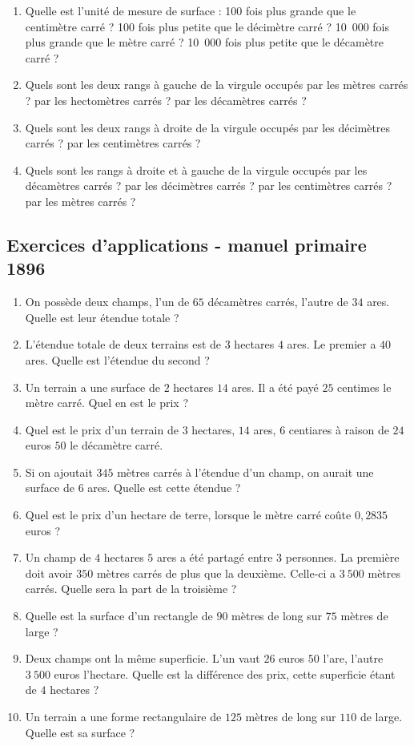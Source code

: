 \documentclass[12 pt]{extarticle}
\theoremstyle{plain}
\begin{document}
\begin{enumerate}
\item Quelle est l'unité de mesure de surface : 100 fois plus grande que le centimètre carré ? 100 fois plus petite que le décimètre carré ? 10~000 fois plus grande que le mètre carré ? 10~000 fois plus petite que le décamètre carré ? 
\item Quels sont les deux rangs à gauche de la virgule occupés par les mètres carrés ? par les hectomètres carrés ? par les décamètres carrés ? 
\item Quels sont les deux rangs à droite de la virgule
occupés par les décimètres carrés ? par les centimètres carrés ? 
\item Quels sont les rangs à droite et à gauche de la virgule occupés par les décamètres carrés ? par les décimètres carrés ? par les centimètres carrés ? par les mètres carrés ? 
\end{enumerate}  
  
  
  \subsection*{Exercices d'applications - manuel primaire 1896}
  
  \begin{enumerate}
  \item On possède deux champs, l'un de $65$ décamètres carrés, l'autre de $34$ ares. 
  Quelle est leur étendue totale ? 
  \item L'étendue totale de deux terrains est de $3$ hectares $4$ ares. Le premier a $40$ ares. Quelle est l'étendue du second ? 
  \item Un terrain a une surface de $2$ hectares $14$ ares. Il a été payé $25$ centimes le mètre carré. Quel en est le prix ? 
  \item Quel est le prix d'un terrain de $3$ hectares, $14$ ares, $6$ centiares à raison de $24$ euros $50$ le décamètre carré. 
  \item Si on ajoutait $345$ mètres carrés à l'étendue d'un champ, on aurait une surface de $6$ ares. Quelle est cette étendue ? 
  \item Quel est le prix d'un hectare de terre, lorsque le mètre carré coûte $0,2835$ euros ? 
  \item Un champ de $4$ hectares $5$ ares a été partagé entre $3$ personnes. La première doit avoir $350$ mètres carrés de plus que la deuxième. Celle-ci a $3~500$ mètres carrés. Quelle sera la part de la troisième ? 
  \item Quelle est la surface d'un rectangle de $90$ mètres de long sur $75$ mètres de large ? 
  \item Deux champs ont la même superficie. L'un vaut $26$ euros $50$ l'are, l'autre $3~500$ euros l'hectare. Quelle est la différence des prix, cette superficie étant de $4$ hectares ? 
  \item Un terrain a une forme rectangulaire de $125$ mètres de long sur $110$ de large. Quelle est sa surface ? 
  \end{enumerate}
\end{document}
